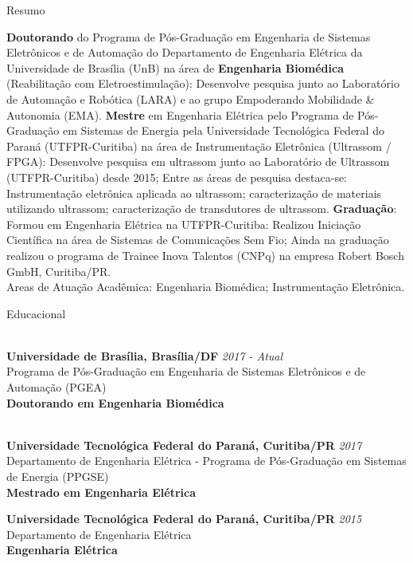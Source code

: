 \documentclass{resume} %
\begin{document}

\begin{rSection}{Resumo}

\textbf{Doutorando} do Programa de Pós-Graduação em Engenharia de Sistemas Eletrônicos e de Automação do Departamento de Engenharia Elétrica da Universidade de Brasília (UnB) na área de \textbf{Engenharia Biomédica} (Reabilitação com Eletroestimulação): 
Desenvolve pesquisa junto ao Laboratório de Automação e Robótica (LARA) e ao grupo Empoderando Mobilidade & Autonomia (EMA).
\textbf{Mestre} em Engenharia Elétrica pelo Programa de Pós-Graduação em Sistemas de Energia pela Universidade Tecnológica Federal do Paraná (UTFPR-Curitiba) na área de Instrumentação Eletrônica (Ultrassom / FPGA):
Desenvolve pesquisa em ultrassom junto ao Laboratório de Ultrassom (UTFPR-Curitiba) desde 2015; Entre as áreas de pesquisa destaca-se: Instrumentação eletrônica aplicada ao ultrassom; caracterização de materiais utilizando ultrassom; caracterização de transdutores de ultrassom.
\textbf{Graduação}: Formou em Engenharia Elétrica na UTFPR-Curitiba: Realizou Iniciação Científica na área de Sistemas de Comunicações Sem Fio; Ainda na graduação realizou o programa de Trainee Inova Talentos (CNPq) na empresa Robert Bosch GmbH, Curitiba/PR.
\\ Areas de Atuação Acadêmica: Engenharia Biomédica; Instrumentação Eletrônica.

\end{rSection}
\begin{rSection}{Educacional}

\\{\bf Universidade de Brasília, Brasília/DF} \hfill {\em 2017 - Atual} 
\\ \small{Programa de Pós-Graduação em Engenharia de Sistemas Eletrônicos e de Automação (PGEA)}
\\ \textbf{Doutorando em Engenharia Biomédica}

\\{\bf Universidade Tecnológica Federal do Paraná, Curitiba/PR} \hfill {\em 2017} 
\\ \small{Departamento de Engenharia Elétrica - Programa de Pós-Graduação em Sistemas de Energia (PPGSE)}
\\ \textbf{Mestrado em Engenharia Elétrica}

{\bf Universidade Tecnológica Federal do Paraná, Curitiba/PR} \hfill {\em 2015} 
\\ Departamento de Engenharia Elétrica
\\\textbf{Engenharia Elétrica}




\end{rSection}
\end{document}
